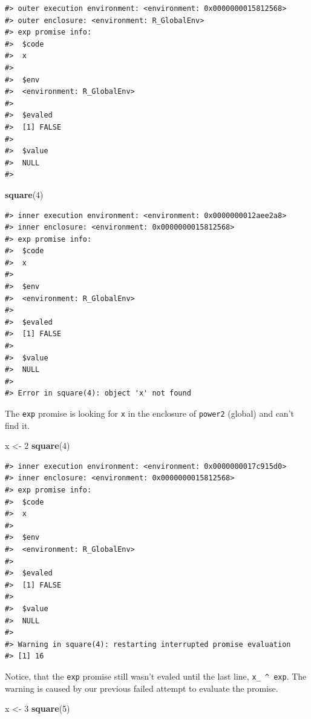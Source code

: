 \documentclass[]{book}
\newenvironment{Shaded}{\begin{snugshade}}{\end{snugshade}}
\newcommand{\DecValTok}[1]{\textcolor[rgb]{0.00,0.00,0.81}{#1}}
\newcommand{\KeywordTok}[1]{\textcolor[rgb]{0.13,0.29,0.53}{\textbf{#1}}}
\newcommand{\NormalTok}[1]{#1}
\newcommand{\StringTok}[1]{\textcolor[rgb]{0.31,0.60,0.02}{#1}}
\begin{document}
\begin{verbatim}
#> outer execution environment: <environment: 0x0000000015812568>
#> outer enclosure: <environment: R_GlobalEnv>
#> exp promise info: 
#>  $code
#>  x
#>  
#>  $env
#>  <environment: R_GlobalEnv>
#>  
#>  $evaled
#>  [1] FALSE
#>  
#>  $value
#>  NULL
#>  
\end{verbatim}

\begin{Shaded}
\begin{Highlighting}[]
\KeywordTok{square}\NormalTok{(}\DecValTok{4}\NormalTok{)}
\end{Highlighting}
\end{Shaded}

\begin{verbatim}
#> inner execution environment: <environment: 0x0000000012aee2a8>
#> inner enclosure: <environment: 0x0000000015812568>
#> exp promise info: 
#>  $code
#>  x
#>  
#>  $env
#>  <environment: R_GlobalEnv>
#>  
#>  $evaled
#>  [1] FALSE
#>  
#>  $value
#>  NULL
#>  
#> Error in square(4): object 'x' not found
\end{verbatim}

The \texttt{exp} promise is looking for \texttt{x} in the enclosure of \texttt{power2} (global) and can't find it.

\begin{Shaded}
\begin{Highlighting}[]
\NormalTok{x <-}\StringTok{ }\DecValTok{2}
\KeywordTok{square}\NormalTok{(}\DecValTok{4}\NormalTok{)}
\end{Highlighting}
\end{Shaded}

\begin{verbatim}
#> inner execution environment: <environment: 0x0000000017c915d0>
#> inner enclosure: <environment: 0x0000000015812568>
#> exp promise info: 
#>  $code
#>  x
#>  
#>  $env
#>  <environment: R_GlobalEnv>
#>  
#>  $evaled
#>  [1] FALSE
#>  
#>  $value
#>  NULL
#>  
#> Warning in square(4): restarting interrupted promise evaluation
#> [1] 16
\end{verbatim}

Notice, that the \texttt{exp} promise still wasn't evaled until the last line, \texttt{x\_\ \^{}\ exp}. The warning is caused by our previous failed attempt to evaluate the promise.

\begin{Shaded}
\begin{Highlighting}[]
\NormalTok{x <-}\StringTok{ }\DecValTok{3}
\KeywordTok{square}\NormalTok{(}\DecValTok{5}\NormalTok{)}
\end{Highlighting}
\end{Shaded}
\end{document}
